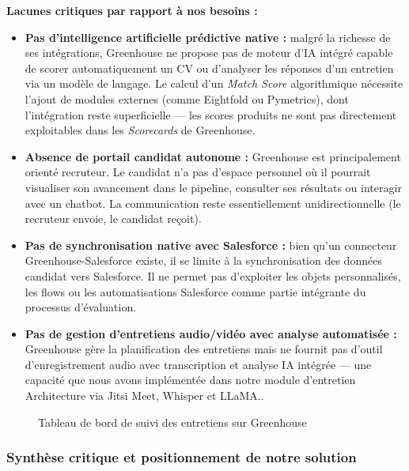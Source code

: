 \textbf{Lacunes critiques par rapport à nos besoins :}
\begin{itemize}
    \item \textbf{Pas d'intelligence artificielle prédictive native :} malgré la richesse de ses intégrations, Greenhouse ne propose pas de moteur d'IA intégré capable de scorer automatiquement un CV ou d'analyser les réponses d'un entretien via un modèle de langage. Le calcul d'un \textit{Match Score} algorithmique nécessite l'ajout de modules externes (comme Eightfold ou Pymetrics), dont l'intégration reste superficielle --- les scores produits ne sont pas directement exploitables dans les \textit{Scorecards} de Greenhouse.
    \item \textbf{Absence de portail candidat autonome :} Greenhouse est principalement orienté recruteur. Le candidat n'a pas d'espace personnel où il pourrait visualiser son avancement dans le pipeline, consulter ses résultats ou interagir avec un chatbot. La communication reste essentiellement unidirectionnelle (le recruteur envoie, le candidat reçoit).
    \item \textbf{Pas de synchronisation native avec Salesforce :} bien qu'un connecteur Greenhouse-Salesforce existe, il se limite à la synchronisation des données candidat vers Salesforce. Il ne permet pas d'exploiter les objets personnalisés, les flows ou les automatisations Salesforce comme partie intégrante du processus d'évaluation.
    \item \textbf{Pas de gestion d'entretiens audio/vidéo avec analyse automatisée :} Greenhouse gère la planification des entretiens mais ne fournit pas d'outil d'enregistrement audio avec transcription et analyse IA intégrée --- une capacité que nous avons implémentée dans notre module d'entretien Architecture via Jitsi Meet, Whisper et LLaMA.\parencite{URL26}.
\end{itemize}

\begin{figure}[hbt!]
    \centering
    \caption{Tableau de bord de suivi des entretiens sur Greenhouse}
    \label{fig:existant_greenhouse}
\end{figure}

\FloatBarrier

\subsubsection{Synthèse critique et positionnement de notre solution}

